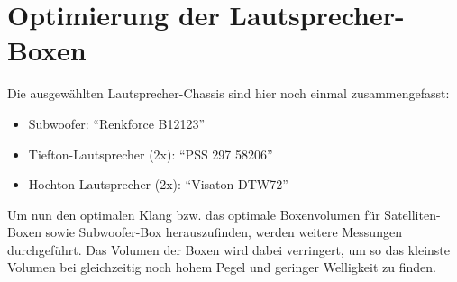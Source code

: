 

\newpage
\section{Optimierung der Lautsprecher-Boxen}\label{sec:4.4}
Die ausgewählten Lautsprecher-Chassis sind hier noch einmal zusammengefasst:
\begin{itemize}
	\item Subwoofer: \enquote{Renkforce B12123}
	\item Tiefton-Lautsprecher (2x): \enquote{PSS 297 58206}
	\item Hochton-Lautsprecher (2x): \enquote{Visaton DTW72}
\end{itemize}
Um nun den optimalen Klang bzw. das optimale Boxenvolumen für Satelliten-Boxen sowie Subwoofer-Box herauszufinden, werden weitere Messungen durchgeführt.
Das Volumen der Boxen wird dabei verringert, um so das kleinste Volumen bei gleichzeitig noch hohem Pegel und geringer Welligkeit zu finden.

